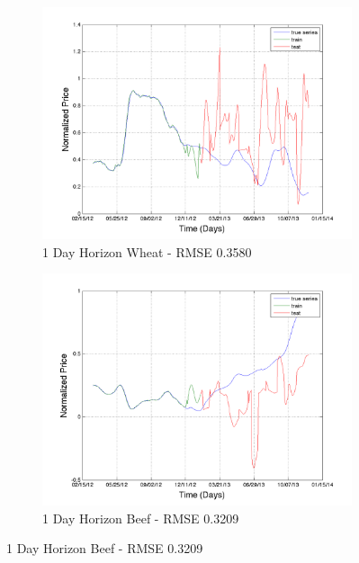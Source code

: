 \begin{figure}
        \centering
        \begin{subfigure}[b]{0.5\textwidth}
                \includegraphics[width=\textwidth]{img/model/exp2/wheat/pred_1}
                \caption{1 Day Horizon Wheat - RMSE 0.3580}
                \label{fig:gull}
        \end{subfigure}%
        \begin{subfigure}[b]{0.5\textwidth}
                \includegraphics[width=\textwidth]{img/model/exp2/beef/pred_1}
                \caption{1 Day Horizon Beef - RMSE 0.3209  }
                \label{fig:tiger}
        \end{subfigure}
       

\end{figure}
